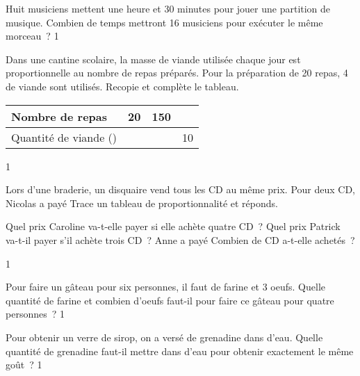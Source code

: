 \documentclass[a4paper,11pt]{report}
\begin{document}
\begin{exo}{
 Huit musiciens mettent une heure et 30 minutes pour jouer une partition de musique.
Combien de temps mettront 16 musiciens pour exécuter le même morceau~?
}{1}\end{exo}

\begin{exo}{
Dans une cantine scolaire, la masse de viande
utilisée chaque jour est proportionnelle au
nombre de repas préparés. Pour la préparation
de 20 repas, 4 \tunit{}{\kg} de viande sont utilisés. Recopie et complète le tableau.

\begin{center}
{\renewcommand{\arraystretch}{1.5}\setlength{\tabcolsep}{1cm}
\begin{tabular}{|l|c|c|c|}\hline
Nombre de repas & 20 & 150 &  \\\hline
Quantité de viande (\tunit{}{\kg}) & & & 10 \\\hline
\end{tabular}}
\end{center}
\vspace{-0.3cm}
}{1}\end{exo}


\begin{exo}{
Lors d'une braderie, un disquaire vend tous les
CD au même prix. Pour deux CD, Nicolas a payé
Trace un tableau de proportionnalité et réponds.
\vspace{-0.3cm}
\begin{tasks}[after-item-skip = 0.2em]
\task  Quel prix Caroline va-t-elle payer si elle
achète quatre CD~?
\task  Quel prix Patrick va-t-il payer s'il achète trois
CD~?
\task Anne a payé  Combien de CD
a-t-elle achetés~?
\end{tasks}
\vspace{-0.3cm}
}{1}\end{exo}


\begin{exo}{
Pour faire un gâteau pour six personnes, il faut
 de farine et 3 oeufs. Quelle quantité de
farine et combien d'oeufs faut-il pour faire ce
gâteau pour quatre personnes~?
\vspace{-0.1cm}
}{1}\end{exo}


\begin{exo}{
Pour obtenir un verre de sirop, on a versé
 de grenadine dans  d'eau.
Quelle quantité de grenadine faut-il mettre dans
 d'eau pour obtenir exactement le même
goût~?
\vspace{-0.1cm}
}{1}\end{exo}
\end{document}
